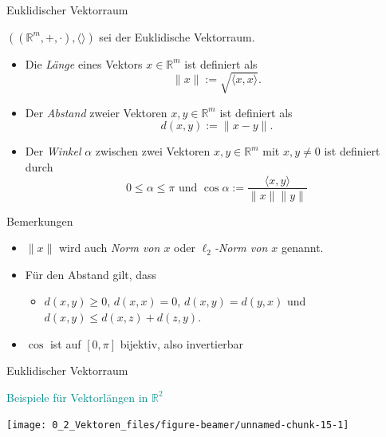 \documentclass[
  8pt,
  ignorenonframetext,
]{beamer}
\begin{document}
\begin{frame}{Euklidischer Vektorraum}
\protect\hypertarget{euklidischer-vektorraum-3}{}
\vspace{3mm}
\justify
{}
\small

\begin{definition}
$((\mathbb{R}^m,+,\cdot),\langle\rangle)$ sei der Euklidische Vektorraum.
\begin{itemize}
\item Die \textit{Länge} eines Vektors $x \in \mathbb{R}^m$ ist definiert als
\begin{equation}
\lVert x \rVert := \sqrt{\langle x,x \rangle}.
\end{equation}
\item Der \textit{Abstand} zweier Vektoren $x,y \in \mathbb{R}^m$ ist definiert als
\begin{equation}
d(x,y) := \lVert x-y \rVert.
\end{equation}
\item Der \textit{Winkel} $\alpha$ zwischen zwei Vektoren $x,y \in \mathbb{R}^m$ mit $x,y \neq 0$ ist definiert durch \begin{equation}
0 \leq \alpha \leq \pi \text{ und } \cos\alpha := \frac{\langle x,y \rangle}{\lVert x \rVert\lVert y \rVert}
\end{equation}
\end{itemize}
\end{definition}

\footnotesize

Bemerkungen

\begin{itemize}
\item $\lVert x \rVert$ wird auch \textit{Norm von $x$} oder \textit{$\ell_2$-Norm von $x$} genannt.
\item Für den Abstand gilt, dass
\begin{itemize}
\footnotesize
\item $d(x,y) \geq 0$, $d(x,x) = 0$, $d(x,y) = d(y,x)$ und $d(x,y) \leq d(x,z) + d(z,y)$.
\end{itemize}
\item $\cos$ ist auf $[0, \pi]$ bijektiv, also invertierbar
\end{itemize}
\end{frame}

\begin{frame}{Euklidischer Vektorraum}
\protect\hypertarget{euklidischer-vektorraum-4}{}
\vspace{3mm}

\textcolor{darkcyan}{Beispiele für Vektorlängen in $\mathbb{R}^2$}
\vspace{9pt}

\begin{center}\texttt{[image: 0\_2\_Vektoren\_files/figure-beamer/unnamed-chunk-15-1]} \end{center}
\end{frame}
\end{document}
